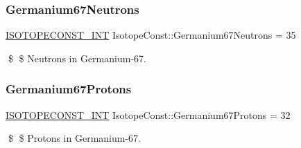 \subsubsection{\texorpdfstring{Germanium67\+Neutrons}{Germanium67Neutrons}}
{\footnotesize\ttfamily \mbox{\hyperlink{group___isotope_const-_macros_ga5f18360b3e99483a35c32d789e62621c}{I\+S\+O\+T\+O\+P\+E\+C\+O\+N\+S\+T\+\_\+\+I\+NT}} Isotope\+Const\+::\+Germanium67\+Neutrons = 35}

\$ \$ Neutrons in Germanium-\/67. \mbox{\label{group___isotope_const-_germanium-_ge67_ga55fc2a8787c4dcb307adf001b5aaadf3}} 
\subsubsection{\texorpdfstring{Germanium67\+Protons}{Germanium67Protons}}
{\footnotesize\ttfamily \mbox{\hyperlink{group___isotope_const-_macros_ga5f18360b3e99483a35c32d789e62621c}{I\+S\+O\+T\+O\+P\+E\+C\+O\+N\+S\+T\+\_\+\+I\+NT}} Isotope\+Const\+::\+Germanium67\+Protons = 32}

\$ \$ Protons in Germanium-\/67. 